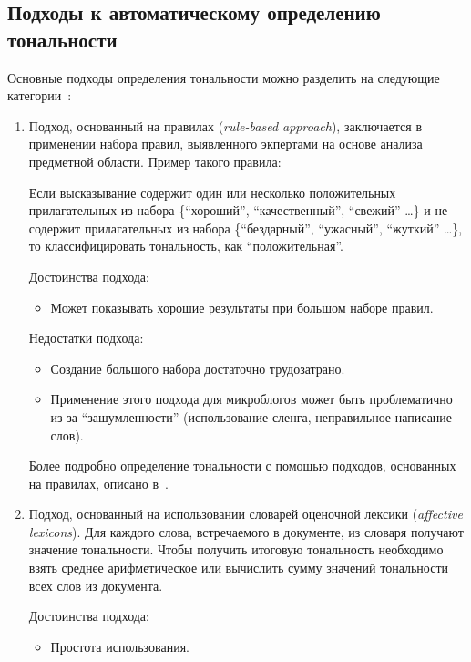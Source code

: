 \subsection{Подходы к автоматическому определению тональности}

Основные подходы определения тональности можно разделить на следующие категории~\cite{habrasent}:

\begin{enumerate}

\item { Подход, основанный на правилах (\textit{rule-based approach}), заключается в применении набора правил, выявленного экпертами на основе анализа предметной области. Пример такого правила:
\begin{framed}
Если высказывание содержит один или несколько положительных прилагательных из набора \{``хороший'', ``качественный'', ``свежий'' \ldots \} и не содержит прилагательных из набора \{``бездарный'', ``ужасный'', ``жуткий'' \ldots \}, то классифицировать тональность, как ``положительная''.
\end{framed}
Достоинства подхода:
\begin{itemize}
\item {  Может показывать хорошие результаты при большом наборе правил.}
\end{itemize}

Недостатки подхода:
\begin{itemize}
\item {  Создание большого набора достаточно трудозатрано.  }
\item {  Применение этого подхода для микроблогов может быть проблематично из-за ``зашумленности'' (использование сленга, неправильное написание слов). }
\end{itemize} 

Более подробно определение тональности с помощью подходов, основанных на правилах, описано в~\cite{rule_romip1, rule_romip2}.

}

\item {
  Подход, основанный на использовании словарей оценочной лексики (\textit{affective lexicons}). 
  Для каждого слова, встречаемого в документе, из словаря получают значение тональности. Чтобы получить итоговую тональность необходимо взять среднее арифметическое или вычислить сумму значений тональности всех слов из документа. 

Достоинства подхода:
\begin{itemize}
\item {  Простота использования. }
\end{itemize}

}
\end{enumerate}

